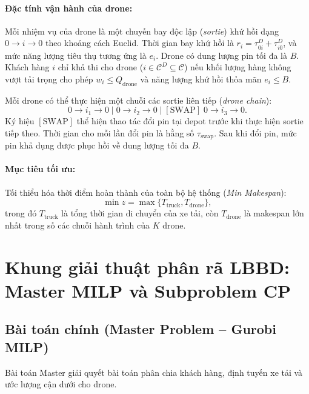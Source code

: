 \documentclass[12pt,a4paper]{article}
\newcommand{\C}{\mathcal{C}}
\newcommand{\CD}{\mathcal{C}^{D}}
\newcommand{\swap}{\tau_{\mathrm{swap}}}
\begin{document}
\paragraph{Đặc tính vận hành của drone:}
Mỗi nhiệm vụ của drone là một chuyến bay độc lập (\emph{sortie}) khứ hồi dạng $0 \to i \to 0$ theo khoảng cách Euclid. Thời gian bay khứ hồi là $r_i = \tau^D_{0i} + \tau^D_{i0}$, và mức năng lượng tiêu thụ tương ứng là $e_i$. Drone có dung lượng pin tối đa là $B$. Khách hàng $i$ chỉ khả thi cho drone ($i \in \CD \subseteq \C$) nếu khối lượng hàng không vượt tải trọng cho phép $w_i \le Q_{\text{drone}}$ và năng lượng khứ hồi thỏa mãn $e_i \le B$.

Mỗi drone có thể thực hiện một chuỗi các sortie liên tiếp (\emph{drone chain}):
\[
    0 \to i_1 \to 0 \;|\; 0 \to i_2 \to 0 \;|\; [\mathrm{SWAP}] \; 0 \to i_3 \to 0.
\]
Ký hiệu $[\mathrm{SWAP}]$ thể hiện thao tác đổi pin tại depot trước khi thực hiện sortie tiếp theo. Thời gian cho mỗi lần đổi pin là hằng số $\swap$. Sau khi đổi pin, mức pin khả dụng được phục hồi về dung lượng tối đa $B$.

\paragraph{Mục tiêu tối ưu:}
Tối thiểu hóa thời điểm hoàn thành của toàn bộ hệ thống (\emph{Min Makespan}):
\begin{equation}
    \min z = \max\{T_{\mathrm{truck}}, T_{\mathrm{drone}}\},
    \label{eq:objective-orig}
\end{equation}
trong đó $T_{\mathrm{truck}}$ là tổng thời gian di chuyển của xe tải, còn $T_{\mathrm{drone}}$ là makespan lớn nhất trong số các chuỗi hành trình của $K$ drone.

\section{Khung giải thuật phân rã LBBD: Master MILP và Subproblem CP}
\label{sec:decomposition-framework}

\subsection{Bài toán chính (Master Problem -- Gurobi MILP)}

Bài toán Master giải quyết bài toán phân chia khách hàng, định tuyến xe tải và ước lượng cận dưới cho drone.
\end{document}
